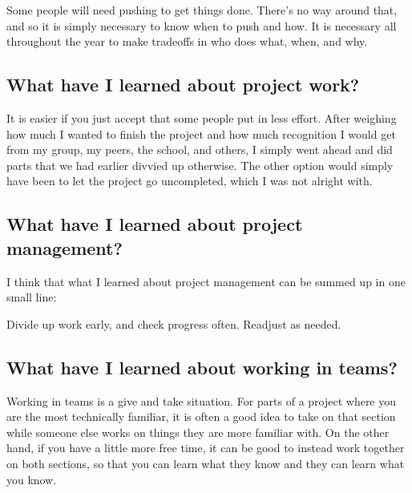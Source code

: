 \documentclass[onecolumn, draftclsnofoot,10pt, compsoc]{IEEEtran}
\begin{document}
Some people will need pushing to get things done. There's no way around that, and
so it is simply necessary to know when to push and how. It is necessary all throughout
the year to make tradeoffs in who does what, when, and why.

\subsection{What have I learned about project work?}

It is easier if you just accept that some people put in less effort. After weighing
how much I wanted to finish the project and how much recognition I would get from
my group, my peers, the school, and others, I simply went ahead and did parts that
we had earlier divvied up otherwise. The other option would simply have been to
let the project go uncompleted, which I was not alright with.

\subsection{What have I learned about project management?}

I think that what I learned about project management can be summed up in one small line:

\begin{displayquote}
Divide up work early, and check progress often. Readjust as needed.
\end{displayquote}

\subsection{What have I learned about working in teams?}

Working in teams is a give and take situation. For parts of a project where you
are the most technically familiar, it is often a good idea to take on that section
while someone else works on things they are more familiar with. On the other hand,
if you have a little more free time, it can be good to instead work together on
both sections, so that you can learn what they know and they can learn what you
know.
\end{document}
